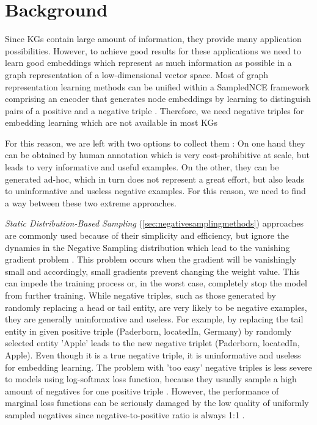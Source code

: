 \chapter{Background}
\label{ch:background}

Since \acp{KG} contain large amount of information, they provide many application possibilities.
However, to achieve good results for these applications we need to learn good embeddings which represent as much information as possible in a graph representation of a low-dimensional vector space.
Most of graph representation learning methods can be unified within a \ac{SampledNCE} framework comprising an encoder that generates node embeddings by learning to distinguish pairs of a positive and a negative triple \cite{MCNS}.
Therefore, we need negative triples for embedding learning which are not available in most \acp{KG} 

For this reason, we are left with two options to collect them \cite{safavi2021negater}: 
On one hand they can be obtained by human annotation which is very cost-prohibitive at scale, but leads to very informative and useful examples. 
On the other, they can be generated ad-hoc, which in turn does not represent a great effort, but also leads to uninformative and useless negative examples.
For this reason, we need to find a way between these two extreme approaches.

\textit{Static Distribution-Based Sampling} (\autoref{sec:negativesamplingmethods}) approaches are commonly used because of their simplicity and efficiency, but ignore the dynamics in the Negative Sampling distribution which lead to the vanishing gradient problem \cite{qianunderstanding}.
This problem occurs when the gradient will be vanishingly small and accordingly, small gradients prevent changing the weight value.
This can impede the training process or, in the worst case, completely stop the model from further training.
While negative triples, such as those generated by randomly replacing a head or tail entity, are very likely to be negative examples, they are generally uninformative and useless.
For example, by replacing the tail entity in given positive triple (Paderborn, locatedIn, Germany) by randomly selected entity 'Apple' leads to the new negative triplet (Paderborn, locatedIn, Apple).
Even though it is a true negative triple, it is uninformative and useless for embedding learning.
The problem with 'too easy' negative triples is less severe to models using log-softmax loss function, because they usually sample a high amount of negatives for one positive triple \cite{cai2017kbgan}.
However, the performance of marginal loss functions can be seriously damaged by the low quality of uniformly sampled negatives since negative-to-positive ratio is always 1:1 \cite{cai2017kbgan}.

